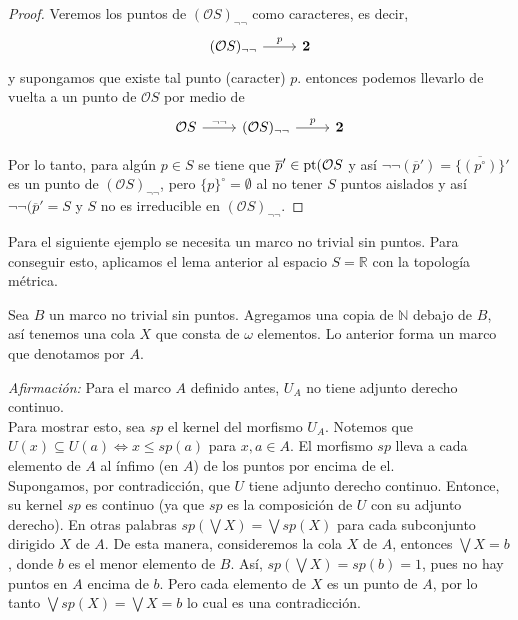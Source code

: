 \begin{proof}
    Veremos los puntos de $(\mathcal{O}S)_{\neg\neg}$ como caracteres, es decir,
    \[\begin{tikzcd}
	{(\mathcal{O}S)_{\neg\neg}} & {\mathbf{2}}
	\arrow["p", from=1-1, to=1-2]
\end{tikzcd}\]
    y supongamos que existe tal punto (caracter) $p$. entonces podemos llevarlo de vuelta a un punto de $\mathcal{O}S$ por medio de 
    \[\begin{tikzcd}
	{\mathcal{O}S} & {(\mathcal{O}S)_{\neg\neg}} & {\mathbf{2}}
	\arrow["{\neg\neg}", from=1-1, to=1-2]
	\arrow["p", from=1-2, to=1-3]
\end{tikzcd}\]

Por lo tanto, para algún $p\in S$ se tiene que $\overline{p}'\in \mathrm{pt}(\mathcal{O}S$ y así $\neg\neg (\overline{p}')=\overline{\{({p}^\circ)\}}'$ es un punto de $(\mathcal{O}S)_{\neg\neg}$, pero $\{p\}^\circ=\emptyset$ al no tener $S$ puntos aislados y así $\neg\neg(\overline{p}'=S$ y $S$ no es irreducible en $(\mathcal{O}S)_{\neg\neg}$.
\end{proof}

Para el siguiente ejemplo se necesita un marco no trivial sin puntos. Para conseguir esto, aplicamos el lema anterior al espacio $S=\mathbb{R}$ con la topología métrica.

\begin{ej}\label{Ejemplo7.2.7}
    Sea $B$ un marco no trivial sin puntos. Agregamos una copia de $\mathbb{N}$ debajo de $B$, así tenemos una cola $X$ que consta de $\omega$ elementos. Lo anterior forma un marco que denotamos por $A$. 

    \noindent
    \emph{Afirmación:} Para el marco $A$ definido antes, $U_A$ no tiene adjunto derecho continuo.\\

    Para mostrar esto, sea $sp$ el kernel del morfismo $U_A$. Notemos que $U(x)\subseteq U(a)\Leftrightarrow x\leq sp(a)$ para $x, a\in A$. El morfismo $sp$ lleva a cada elemento de $A$ al ínfimo (en $A$) de los puntos por encima de el.\\

    Supongamos, por contradicción, que $U$ tiene adjunto derecho continuo. Entonce, su kernel $sp$ es continuo (ya que $sp$ es la composición de $U$ con su adjunto derecho). En otras palabras $sp(\bigvee X)=\bigvee sp(X)$ para cada subconjunto dirigido $X$ de $A$. De esta manera, consideremos la cola $X$ de $A$, entonces $\bigvee X=b$, donde $b$ es el menor elemento de $B$. Así, $sp(\bigvee X)=sp(b)=1$, pues no hay puntos en $A$ encima de $b$. Pero cada elemento de $X$ es un punto de $A$, por lo tanto $\bigvee sp(X)=\bigvee X=b$ lo cual es una contradicción.
\end{ej}

